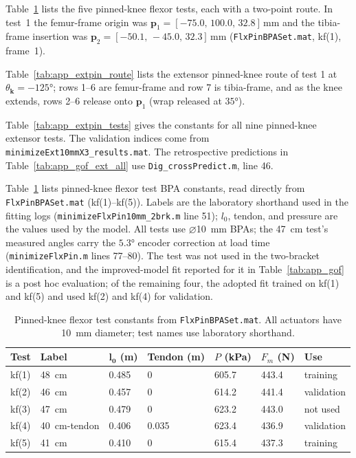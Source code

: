 Table~\ref{tab:app_flxpin_tests} lists the five pinned-knee flexor tests, each with a two-point route. In test~1 the femur-frame origin was $\mathbf{p}_{1}=[-75.0,\,100.0,\,32.8]\,\unit{\mm}$ and the tibia-frame insertion was $\mathbf{p}_{2}=[-50.1,\,-45.0,\,32.3]\,\unit{\mm}$ (\nolinkurl{FlxPinBPASet.mat}, kf(1), frame~1).

Table~\ref{tab:app_extpin_route} lists the extensor pinned-knee route of test 1 at $\theta_{\mathbf{k}}=\ang{-125}$; rows 1--6 are femur-frame and row 7 is tibia-frame, and as the knee extends, rows 2--6 release onto $\mathbf{p}_{1}$ (wrap released at $\ang{+35}$). 

Table~\ref{tab:app_extpin_tests} gives the constants for all nine pinned-knee extensor tests. The validation indices come from \nolinkurl{minimizeExt10mmX3_results.mat}. The retrospective predictions in Table~\ref{tab:app_gof_ext_all} use \nolinkurl{Dig_crossPredict.m}, line 46.

Table~\ref{tab:app_flxpin_tests} lists pinned-knee flexor test BPA constants, read directly from \nolinkurl{FlxPinBPASet.mat} (kf(1)--kf(5)). Labels are the laboratory shorthand used in the fitting logs (\nolinkurl{minimizeFlxPin10mm_2brk.m} line 51); $l_{0}$, tendon, and pressure are the values used by the model. All tests use $\diameter$\qty{10}{\mm} BPAs; the \qty{47}{\cm} test's measured angles carry the $\ang{+5.3}$ encoder correction at load time (\nolinkurl{minimizeFlxPin.m} lines 77--80). The test was not used in the two-bracket identification, and the improved-model fit reported for it in Table~\ref{tab:app_gof} is a post hoc evaluation; of the remaining four, the adopted fit trained on kf(1) and kf(5) and used kf(2) and kf(4) for validation.

\begin{table}[htbp]
\caption{Pinned-knee flexor test constants from \nolinkurl{FlxPinBPASet.mat}. All actuators have \qty{10}{\mm} diameter; test names use laboratory shorthand.}
\label{tab:app_flxpin_tests}
\begin{tabular}{@{}lllllll@{}}
\toprule
\textbf{Test} & \textbf{Label} & $\boldsymbol{l_{0}}$ (\unit{\meter}) & Tendon (\unit{\meter}) & $P$ (\unit{\kPa}) & $F_{m}$ (\unit{\newton}) & \textbf{Use} \\
\midrule
kf(1) & \qty{48}{\cm}         & 0.485 & 0     & 605.7 & 443.4 & training \\
kf(2) & \qty{46}{\cm}         & 0.457 & 0     & 614.2 & 441.4 & validation \\
kf(3) & \qty{47}{\cm}         & 0.479 & 0     & 623.2 & 443.0 & not used \\
kf(4) & \qty{40}{\cm}-tendon  & 0.406 & 0.035 & 623.4 & 436.9 & validation \\
kf(5) & \qty{41}{\cm}         & 0.410 & 0     & 615.4 & 437.3 & training \\
\bottomrule
\end{tabular}
\end{table}

